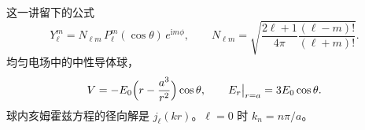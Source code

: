 \documentclass[fontset=windows, chinese, 10pt, xcolor=dvipsnames]{beamer}
\begin{document}
\begin{frame}{这一讲留下的公式}
  \[
    Y_{\ell}^{m}
    =N_{\ell m}\,P_{\ell}^{m}(\cos\theta)\,e^{\mathrm{i}m\phi},
    \qquad
    N_{\ell m}
    =\sqrt{\frac{2\ell+1}{4\pi}\frac{(\ell-m)!}{(\ell+m)!}}.
  \]
  均匀电场中的中性导体球，
  \[
    V=-E_0\Bigl(r-\frac{a^3}{r^2}\Bigr)\cos\theta,
    \qquad
    E_r\big|_{r=a}=3E_0\cos\theta.
  \]
  球内亥姆霍兹方程的径向解是 $j_{\ell}(kr)$。$\ell=0$ 时 $k_n=n\pi/a$。
\end{frame}
\end{document}
